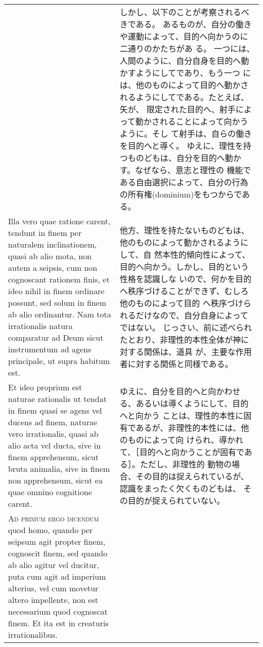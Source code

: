 \documentclass[10pt]{jsarticle} %
\begin{document}
\begin{longtable}{p{21em}p{21em}}
&

しかし、以下のことが考察されるべきである。
あるものが、自分の働きや運動によって、目的へ向かうのに二通りのかたちがあ
 る。
一つには、人間のように、自分自身を目的へ動かすようにしてであり、もう一つ
 には、他のものによって目的へ動かされるようにしてである。たとえば、矢が、
 限定された目的へ、射手によって動かされることによって向かうように。そし
 て射手は、自らの働きを目的へと導く。
ゆえに、理性を持つものどもは、自分を目的へ動かす。なぜなら、意志と理性の
 機能である自由選択によって、自分の行為の所有権(dominium)をもつからである。



\\

Illa vero quae ratione carent, tendunt in finem
per naturalem inclinationem, quasi ab alio mota, non autem a seipsis,
cum non cognoscant rationem finis, et ideo nihil in finem ordinare
possunt, sed solum in finem ab alio ordinantur. Nam tota irrationalis
natura comparatur ad Deum sicut instrumentum ad agens principale, ut
supra habitum est. 


&

他方、理性を持たないものどもは、他のものによって動かされるようにして、自
 然本性的傾向性によって、目的へ向かう。しかし、目的という性格を認識しな
 いので、何かを目的へ秩序づけることができず、むしろ他のものによって目的
 へ秩序づけられるだけなので、自分自身によってではない。
じっさい、前に述べられたとおり、非理性的本性全体が神に対する関係は、道具
 が、主要な作用者に対する関係と同様である。



\\


Et ideo proprium est naturae rationalis ut tendat in
finem quasi se agens vel ducens ad finem, naturae vero irrationalis,
quasi ab alio acta vel ducta, sive in finem apprehensum, sicut bruta
animalia, sive in finem non apprehensum, sicut ea quae omnino cognitione
carent.


&


ゆえに、自分を目的へと向かわせる、あるいは導くようにして、目的へと向かう
 ことは、理性的本性に固有であるが、非理性的本性には、他のものによって向
 けられ、導かれて、［目的へと向かうことが固有である］。ただし、非理性的
 動物の場合、その目的は捉えられているが、認識をまったく欠くものどもは、
 その目的が捉えられていない。

\\


{\scshape Ad primum ergo dicendum} quod homo, quando
per seipsum agit propter finem, cognoscit finem, sed quando ab alio
agitur vel ducitur, puta cum agit ad imperium alterius, vel cum movetur
altero impellente, non est necessarium quod cognoscat finem. Et ita est
in creaturis irrationalibus.



\end{longtable}
\end{document}
